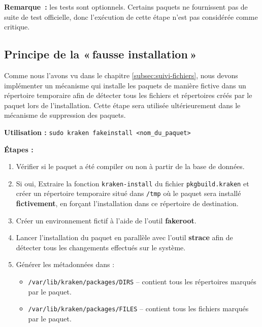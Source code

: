 \textbf{Remarque :} les tests sont optionnels. Certains paquets ne fournissent pas de suite de test officielle, donc l'exécution de cette étape n'est pas considérée comme critique.











\subsection*{Principe de la « fausse installation »}  
\label{subsecc:fakeinstall}
Comme nous l'avons vu dans le chapitre \ref{subsec:suivi-fichiers}, nous devons implémenter un mécanisme qui installe les paquets de manière fictive dans un répertoire temporaire afin de détecter tous les fichiers et répertoires créés par le paquet lors de l'installation. Cette étape sera utilisée ultérieurement dans le mécanisme de suppression des paquets.

\textbf{Utilisation :} \texttt{sudo kraken fakeinstall <nom\_du\_paquet>}

\textbf{Étapes :}
\begin{enumerate}
  \item Vérifier si le paquet a été compiler  ou non à partir de la base de données.
  \item Si oui, Extraire la fonction \texttt{kraken-install} du fichier \texttt{pkgbuild.kraken} et créer un répertoire temporaire situé dans \texttt{/tmp} où le paquet sera installé \textbf{fictivement}, en forçant l’installation dans ce répertoire de destination.
  \item Créer un environnement fictif à l’aide de l’outil \textbf{fakeroot}.
  \item Lancer l’installation du paquet  en parallèle avec l’outil \textbf{strace} afin de détecter tous les changements effectués sur le système.
  \item Générer les métadonnées dans :
  \begin{itemize}
    \item \texttt{/var/lib/kraken/packages/DIRS} -- contient tous les répertoires marqués par le paquet.
    \item \texttt{/var/lib/kraken/packages/FILES} -- contient tous les fichiers marqués par le paquet.
  \end{itemize}
\end{enumerate}

